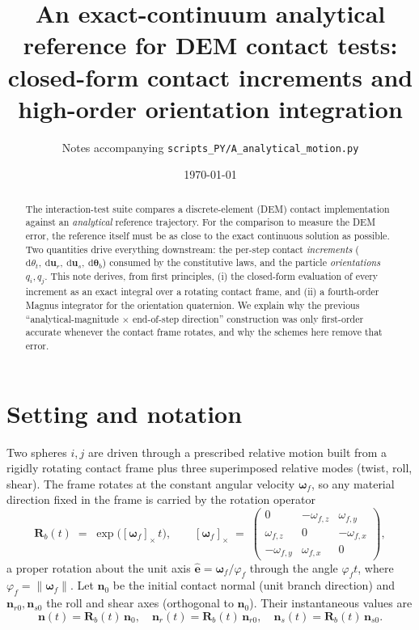 \documentclass[11pt]{article}
\title{\bfseries An exact-continuum analytical reference for DEM contact tests:\\
closed-form contact increments and high-order orientation integration}
\author{Notes accompanying \texttt{scripts\_PY/A\_analytical\_motion.py}}
\date{\today}
\newcommand{\Rb}{\mathbf{R}_b}
\newcommand{\nf}{\hat{\mathbf{e}}}            %
\newcommand{\bwf}{\boldsymbol{\omega}_f}
\newcommand{\norm}[1]{\lVert #1 \rVert}
\begin{document}
\maketitle

\begin{abstract}
The interaction-test suite compares a discrete-element (DEM) contact implementation
against an \emph{analytical} reference trajectory. For the comparison to measure the
DEM error, the reference itself must be as close to the exact continuous solution as
possible. Two quantities drive everything downstream: the per-step contact
\emph{increments} ($\mathrm{d}\theta_t,\ \mathrm{d}\mathbf{u}_r,\ \mathrm{d}\mathbf{u}_s,\
\mathrm{d}\boldsymbol{\theta}_b$) consumed by the constitutive laws, and the particle
\emph{orientations} $q_i,q_j$. This note derives, from first principles, (i) the
closed-form evaluation of every increment as an exact integral over a rotating contact
frame, and (ii) a fourth-order Magnus integrator for the orientation quaternion. We
explain why the previous ``analytical-magnitude $\times$ end-of-step direction''
construction was only first-order accurate whenever the contact frame rotates, and why
the schemes here remove that error.
\end{abstract}

\tableofcontents

\section{Setting and notation}
\label{sec:setup}

Two spheres $i,j$ are driven through a prescribed relative motion built from a rigidly
rotating contact frame plus three superimposed relative modes (twist, roll, shear). The
frame rotates at the constant angular velocity $\bwf$, so any material direction fixed in
the frame is carried by the rotation operator
\begin{equation}
  \Rb(t) \;=\; \exp\!\big([\bwf]_\times\, t\big),
  \qquad
  [\bwf]_\times \;=\;
  \begin{pmatrix} 0 & -\omega_{f,z} & \omega_{f,y}\\
                  \omega_{f,z} & 0 & -\omega_{f,x}\\
                 -\omega_{f,y} & \omega_{f,x} & 0 \end{pmatrix},
\end{equation}
a proper rotation about the unit axis $\nf=\bwf/\varphi_f$ through the angle $\varphi_f t$,
where $\varphi_f=\norm{\bwf}$. Let $\mathbf{n}_0$ be the initial contact normal (unit
branch direction) and $\mathbf{n}_{r0},\mathbf{n}_{s0}$ the roll and shear axes
(orthogonal to $\mathbf{n}_0$). Their instantaneous values are
\begin{equation}
  \mathbf{n}(t)=\Rb(t)\,\mathbf{n}_0,\quad
  \mathbf{n}_r(t)=\Rb(t)\,\mathbf{n}_{r0},\quad
  \mathbf{n}_s(t)=\Rb(t)\,\mathbf{n}_{s0}.
\end{equation}
\end{document}
